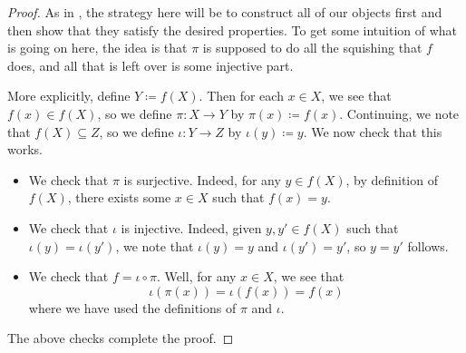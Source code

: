\documentclass[../main.tex]{subfiles}
\begin{document}
% 
\begin{proof}
    As in , the strategy here will be to construct all of our objects first and then show that they satisfy the desired properties. To get some intuition of what is going on here, the idea is that $\pi$ is supposed to do all the squishing that $f$ does, and all that is left over is some injective part.

    More explicitly, define $Y\coloneqq f(X)$. Then for each $x\in X$, we see that $f(x)\in f(X)$, so we define $\pi\colon X\to Y$ by $\pi(x)\coloneqq f(x)$. Continuing, we note that $f(X)\subseteq Z$, so we define $\iota\colon Y\to Z$ by $\iota(y)\coloneqq y$. We now check that this works.
    \begin{itemize}
        \item We check that $\pi$ is surjective. Indeed, for any $y\in f(X)$, by definition of $f(X)$, there exists some $x\in X$ such that $f(x)=y$.
        \item We check that $\iota$ is injective. Indeed, given $y,y'\in f(X)$ such that $\iota(y)=\iota(y')$, we note that $\iota(y)=y$ and $\iota(y')=y'$, so $y=y'$ follows.
        \item We check that $f=\iota\circ\pi$. Well, for any $x\in X$, we see that
        \[\iota(\pi(x))=\iota(f(x))=f(x)\]
        where we have used the definitions of $\pi$ and $\iota$.
    \end{itemize}
    The above checks complete the proof.
\end{proof}
\end{document}
